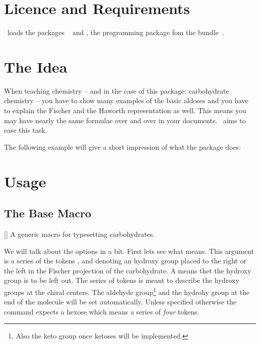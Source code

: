 \documentclass[load-preamble+,scrartcl={DIV10}]{cnltx-doc}
\begin{document}
\section{Licence and Requirements}
\license

\carbohydrates\ loads the packages ~\cite{pkg:chemfig} and
, the programming package fom the 
bundle~\cite{bnd:cnltx}.

\section{The Idea}
When teaching chemistry -- and in the case of this package: carbohydrate
chemistry -- you have to show many examples of the basic aldoses and you have
to explain the Fischer and the Haworth representation as well. This means you
may have nearly the same  formulae over and over in your
documents.  \carbohydrates\ aims to ease this task.

The following example will give a short impression of what the package does:
\begin{example}
  \glucose
  \glucose[model={fischer=skeleton}]
  \setatomsep{2.5em}
  \glucose[model=haworth,ring]
  \glucose[model=haworth,ring=furanose]
\end{example}

\section{Usage}
\subsection{The Base Macro}
\begin{commands}
  []
    A generic macro for typesetting carbohydrates.
\end{commands}
We will talk about the options in a bit. First lets see what 
means.  This argument is a series of the tokens ,  and
 denoting an hydroxy group placed to the right or the left in the
Fischer projection of the carbohydrate.  A  means thet the hydroxy
group is to be left out.  The series of tokens is meant to describe the
hydroxy groups at the chiral centers. The aldehyde group\footnote{Also the
  keto group once ketoses will be implemented.} and the hydrohy group at the
end of the molecule will be set automatically.  Unless specified otherwise the
command expects a hexose which means a series of \emph{four} tokens.
\end{document}
